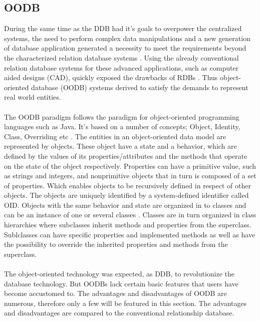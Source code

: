 \documentclass{cslthse-msc}
\begin{document}
\subsection{OODB}
During the same time as the DDB had it's goals to overpower the centralized systems, the need to perform complex data manipulations and a new generation of database application generated a necessity to meet the requirements beyond the characterized relation database systems \cite{OODBMS}. Using the already conventional relation database systems for these advanced applications, such as computer aided designs (CAD), quickly exposed the drawbacks of RDBs \cite{OODBMSshortcomings}. Thus object-oriented database (OODB) systems derived to satisfy the demands to represent real world entities.\\\\
The OODB paradigm follows the paradigm for object-oriented programming languages such as Java. It's based on a number of concepts; Object, Identity, Class, Overriding etc \cite{OODBMSparadigms}. The entities in an object-oriented data model are represented by objects. These object have a state and a behavior, which are defined by the values of its properties/attributes and the methods that operate on the state of the object respectively. Properties can have a primitive value, such as strings and integers, and nonprimitive objects that in turn is composed of a set of properties. Which enables objects to be recursively defined in respect of other objects. The objects are uniquely identified by a system-defined identifier called OID. Objects with the same behavior and state are organized in to classes and can be  an instance of one or several classes \cite{OODBMSclasses}. Classes are in turn organized in class hierarchies where subclasses inherit methods and properties from the superclass. Sublclasses can have specific properties and implemented methods as well as have the possibility to override the inherited properties and methods from the superclass.\\\\
The object-oriented technology was expected, as DDB, to revolutionize the database technology. But OODBs lack certain basic features that users have become accustomed to. 
The advantages and disadvantages of OODB are numerous, therefore only a few will be featured in this section. The advantages and disadvantages are compared to the conventional relationship database.
\end{document}
